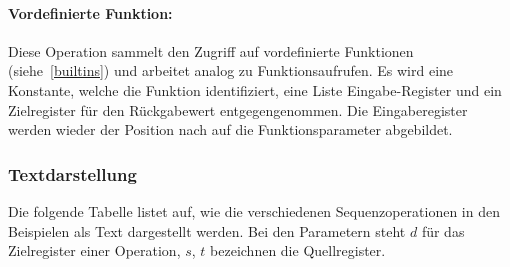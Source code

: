 \documentclass[twoside,a4paper,fleqn,12pt]{article}
\begin{document}
\paragraph{Vordefinierte Funktion:} Diese Operation sammelt den Zugriff auf vordefinierte Funktionen (siehe~\ref{builtins})
und arbeitet analog zu Funktionsaufrufen. Es wird eine Konstante, welche die Funktion identifiziert, eine Liste Eingabe-Register 
und ein Zielregister für den Rückgabewert entgegengenommen. Die Eingaberegister werden wieder der Position nach auf die Funktionsparameter abgebildet.


\subsubsection{Textdarstellung}

Die folgende Tabelle listet auf, wie die verschiedenen Sequenzoperationen in den Beispielen als Text dargestellt werden.
Bei den Parametern steht $d$ für das Zielregister einer Operation, $s$, $t$ bezeichnen die Quellregister.
\end{document}
